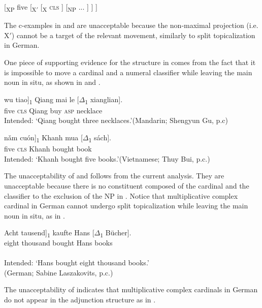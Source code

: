 \documentclass[output=paper]{langscibook}
\begin{document}
\ea\label{tat:ho}
{[}\textsubscript{XP} five [\textsubscript{X$'$} [\textsubscript{X} \textsc{cls} ] [\textsubscript{NP} ... ] ] ]
\z

\noindent The c-examples in  and  are unacceptable because the non-maximal projection (i.e. X$'$) cannot be a target of the relevant movement, similarly to split topicalization in German. 

One piece of supporting evidence for the structure in  comes from the fact that it is impossible to move a cardinal and a numeral classifier while leaving the main noun in situ, as shown in  and .

\ea\label{tat:ex:chi.bad}
\gll \llap{$^*$}\minsp{[} {wu} {tiao}]\textsubscript{1} Qiang mai le [$\Delta$\textsubscript{1} xianglian].\\  
     {} five \textsc{cls} Qiang buy \textsc{asp} {} necklace\\ 
\glt Intended: `Qiang bought three necklaces.'\hfill(Mandarin; Shengyun Gu, p.c)
\z

\ea\label{tat:ex:viet.bad}
\gll \llap{$^*$}\minsp{[} {n\v{a}m} {cuón}]\textsubscript{1} Khanh mua [$\Delta$\textsubscript{1} sách].\\  
     {} five \textsc{cls} Khanh bought {} book\\ 
\glt Intended: `Khanh bought five books.'\hfill(Vietnamese; Thuy Bui, p.c.)
\z

\noindent The unacceptability of  and  follows from the current analysis. They are unacceptable because there is no constituent composed of the cardinal and the classifier to the exclusion of the NP in . Notice that multiplicative complex cardinal in German cannot undergo split topicalization while leaving the main noun in situ, as in .

\ea\label{tat:top.ger}
\gll \llap{*}\minsp{[} {Acht} {tausend}]\textsubscript{$1$} kaufte Hans [$\Delta$\textsubscript{$1$} B\"{u}cher].\\  
     {} eight thousand bought Hans {} books\\ 
     \\
     \glt Intended: `Hans bought eight thousand books.'\\\hfill(German; Sabine Laszakovits, p.c.)
 \z

\noindent The unacceptability of  indicates that multiplicative complex cardinals in German do not appear in the adjunction structure as in .
\end{document}
